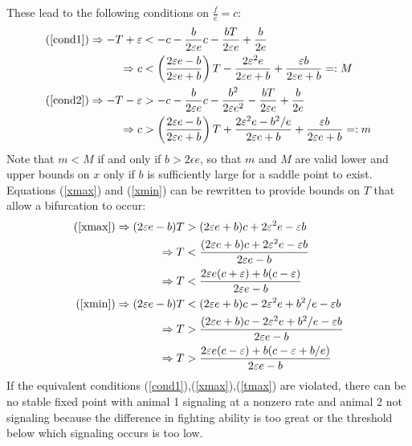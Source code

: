 \documentclass{article}
\begin{document}
These lead to the following conditions on $\frac{f}{e}=c$:
\begin{align}
(\ref{cond1}) \Rightarrow -T+\epsilon&<-c-\frac{b}{2\epsilon e}c-\frac{bT}{2\epsilon e}+\frac{b}{2e} \notag
\\ \Rightarrow c&<\left(\frac{2\epsilon e-b}{2\epsilon e+b}\right)T-\frac{2\epsilon^2e}{2\epsilon e+b}+\frac{\epsilon b}{2\epsilon e+b}=:M \label{xmax}
\\ (\ref{cond2}) \Rightarrow -T-\epsilon&>-c-\frac{b}{2\epsilon e}c-\frac{b^2}{2\epsilon e^2}-\frac{bT}{2\epsilon e}+\frac{b}{2e} \notag
\\ \Rightarrow c&>\left(\frac{2\epsilon e-b}{2\epsilon e+b}\right)T+\frac{2\epsilon^2e-b^2/e}{2\epsilon e +b}+\frac{\epsilon b}{2\epsilon e+b}=:m \label{xmin}
\end{align}
Note that $m<M$ if and only if $b>2\epsilon e$, so that $m$ and $M$ are valid lower and upper bounds on $x$ only if $b$ is sufficiently large for a saddle point to exist.  Equations (\ref{xmax}) and (\ref{xmin}) can be rewritten to provide bounds on $T$ that allow a bifurcation to occur:
\begin{align}
(\ref{xmax}) \Rightarrow(2\epsilon e-b)T&>  (2\epsilon e+b)c +2\epsilon^2e-\epsilon b \notag
\\ \Rightarrow  T&<\frac{(2\epsilon e+b)c+2\epsilon^2e-\epsilon b}{2\epsilon e-b}  \notag
\\ \Rightarrow T&< \frac{ 2\epsilon e(c+\epsilon)+b(c-\epsilon)}{2\epsilon e-b}\label{tmax}
\\(\ref{xmin}) \Rightarrow (2\epsilon e-b)T&< (2\epsilon e+b)c-2\epsilon^2e+b^2/e-\epsilon b \notag
\\ \Rightarrow  T&>\frac{(2\epsilon e+b)c-2\epsilon^2e+b^2/e-\epsilon b}{2\epsilon e-b}\notag
\\ \Rightarrow T&> \frac{2\epsilon e(c-\epsilon)+b(c-\epsilon+b/e)}{2\epsilon e-b} \label{tmin}
\end{align}
If the equivalent conditions (\ref{cond1}),(\ref{xmax}),(\ref{tmax}) are violated, there can be no stable fixed point with animal 1 signaling at a nonzero rate and animal 2 not signaling because the difference in fighting ability is too great or the threshold below which signaling occurs is too low.  
\end{document}
